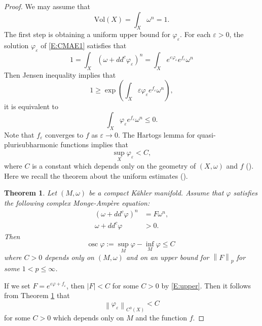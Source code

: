\documentclass{amsart}
\newtheorem{theorem}{Theorem}[section]
\theoremstyle{definition}
\numberwithin{equation}{section}
\begin{document}
\begin{proof}
We may assume that
\begin{equation*}
\mathrm{Vol}(X)
=
\int_X\omega^n
=1.
\end{equation*}
The first step is obtaining a uniform upper bound for $\varphi_\varepsilon$. For each $\varepsilon>0$, the solution $\varphi_\varepsilon$ of \eqref{E:CMAE1} satisfies that 
\begin{equation*}
1=\int_X{\left({\omega+dd^c{\varphi}_{\varepsilon}}\right)}^n
=
\int_X e^{{\varepsilon}{\varphi}_{\varepsilon}} e^{f_{\varepsilon}}\omega^n
\end{equation*}
Then Jensen inequality implies that
\begin{equation*}
1\ge
\exp{\left({\int_X{\varepsilon}{\varphi}_{\varepsilon} e^{f_{\varepsilon}}\omega^n}\right)},
\end{equation*}
it is equivalent to
\begin{equation*}
\int_X{\varphi}_{\varepsilon} e^{f_{\varepsilon}}\omega^n
\le0.
\end{equation*}
Note that $f_{\varepsilon}$ converges to $f$ as ${\varepsilon}\rightarrow0$. The Hartogs lemma for quasi-plurisubharmonic functions implies that
\begin{equation}\label{E:upper}
\sup_X{\varphi}_{\varepsilon}
<
C,
\end{equation}
where $C$ is a constant which depends only on the geometry of $(X,\omega)$ and $f$ (\cite{Guedj_Zerihai}). Here we recall the theorem about the uniform estimates (\cite{Yau, Kolodziej}).

\begin{theorem}\label{T:uniform}
Let $(M,\omega)$ be a compact K\"ahler manifold. Assume that $\varphi$ satisfies the following complex Monge-Amp\`ere equation:
\begin{align*}
{\left({\omega+dd^c\varphi}\right)}^n 
&=
F\omega^n, \\
\omega+dd^c\varphi
&>
0.
\end{align*}
Then
\begin{equation*}
\mathrm{osc}\;\varphi
:=
\sup_M\varphi-\inf_M\varphi
\le
C
\end{equation*}
where $C>0$ depends only on $(M,\omega)$ and on an upper bound for ${\left\|{F}\right\|}_p$ for some $1<p\le\infty$.
\end{theorem}

If we set $F=e^{{\varepsilon}{\varphi}+f_{\varepsilon}}$, then ${\left\vert{F}\right\vert}<C$ for some $C>0$ by \eqref{E:upper}. Then it follows from Theorem \ref{T:uniform} that 
\begin{equation}\label{E:uniform}
{\left\|{{\varphi}_{\varepsilon}}\right\|}_{C^0(X)}<C
\end{equation}
for some $C>0$ which depends only on $M$ and the function $f$.
\medskip


\end{proof}
\end{document}

